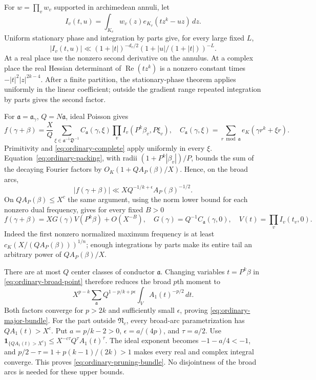 \documentclass[11pt,reqno]{amsart}
\numberwithin{equation}{section}
\theoremstyle{definition}
\begin{document}
For $w=\prod_vw_v$ supported in archimedean annuli, let
\[
 I_v(t,u)=\int_{K_v}w_v(z)e_{K_v}(tz^k-uz)\,dz.
\]
Uniform stationary phase and integration by parts give, for every large fixed $L$,
\begin{equation}\label{eq:ordinary-stationary}
 |I_v(t,u)|\ll(1+|t|)^{-d_v/2}
                (1+|u|/(1+|t|))^{-L}.
\end{equation}
At a real place use the nonzero second derivative on the annulus.
At a complex place the real Hessian determinant of $\operatorname{Re}(tz^k)$
is a nonzero constant times $-|t|^2|z|^{2k-4}$.
After a finite partition, the stationary-phase theorem
\cite[\S7.7]{Hormander2003} applies uniformly in the linear coefficient;
outside the gradient range repeated integration by parts gives the second factor.

For $\mathfrak a=\mathfrak a_\gamma$, $Q=N\mathfrak a$, ideal Poisson gives
\[
 f(\gamma+\beta)=\frac XQ
  \sum_{\xi\in\mathfrak a^{-1}\mathfrak D^{-1}}
    C_{\mathfrak a}(\gamma,\xi)
    \prod_v I_v(P^k\beta_v,P\xi_v),
 \quad
 C_{\mathfrak a}(\gamma,\xi)=
    \sum_{r\bmod\mathfrak a}e_K(\gamma r^k+\xi r).
\]
Primitivity and \eqref{eq:ordinary-complete} apply uniformly in every $\xi$.
Equation~\eqref{eq:ordinary-packing}, with radii
$(1+P^k|\beta_v|)/P$, bounds the sum of the decaying Fourier factors by
$O_K(1+QA_P(\beta)/X)$.
Hence, on the broad arcs,
\begin{equation}\label{eq:ordinary-broad-point}
 |f(\gamma+\beta)|\ll
       XQ^{-1/k+\epsilon}A_P(\beta)^{-1/2}.
\end{equation}
On $QA_P(\beta)\le X^c$ the same argument, using the norm lower bound for
each nonzero dual frequency, gives for every fixed $B>0$
\begin{equation}\label{eq:ordinary-core-formula}
 f(\gamma+\beta)=XG(\gamma)V(P^k\beta)+O(X^{-B}),
 \quad
 G(\gamma)=Q^{-1}C_{\mathfrak a}(\gamma,0),\quad
 V(t)=\prod_v I_v(t_v,0).
\end{equation}
Indeed the first nonzero normalized maximum frequency is at least
$c_K(X/(QA_P(\beta)))^{1/n}$; enough integrations by parts make its entire
tail an arbitrary power of $QA_P(\beta)/X$.

There are at most $Q$ center classes of conductor $\mathfrak a$.
Changing variables $t=P^k\beta$ in \eqref{eq:ordinary-broad-point} therefore
reduces the broad $p$th moment to
\[
 X^{p-k}\sum_{\mathfrak a}Q^{1-p/k+p\epsilon}
         \int_V A_1(t)^{-p/2}\,dt.
\]
Both factors converge for $p>2k$ and sufficiently small $\epsilon$, proving
\eqref{eq:ordinary-major-bundle}.
For the part outside $\mathfrak N_c$, every broad-arc parametrization has
$QA_1(t)>X^c$.  Put $a=p/k-2>0$, $\epsilon=a/(4p)$, and $\tau=a/2$.
Use
$\mathbf1_{\{QA_1(t)>X^c\}}\le X^{-c\tau}Q^\tau A_1(t)^\tau$.
The ideal exponent becomes $-1-a/4<-1$, and
$p/2-\tau=1+p(k-1)/(2k)>1$ makes every real and complex integral converge.
This proves \eqref{eq:ordinary-pruning-bundle}.
No disjointness of the broad arcs is needed for these upper bounds.
\end{document}
